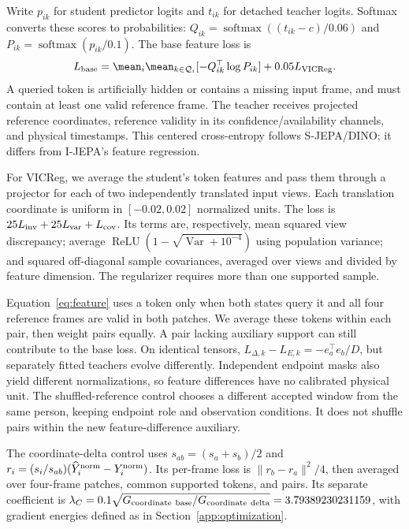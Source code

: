 Write $p_{ik}$ for student predictor logits and $t_{ik}$ for detached teacher logits. Softmax converts these scores to probabilities: $Q_{ik}=\operatorname{softmax}((t_{ik}-c)/0.06)$ and $P_{ik}=\operatorname{softmax}(p_{ik}/0.1)$. The base feature loss is
\begin{equation}
L_{\rm base}=\mean_i\mean_{k\in\mathcal Q_i}[-Q_{ik}^{\top}\log P_{ik}]+0.05L_{\rm VICReg}.
\end{equation}
A queried token is artificially hidden or contains a missing input frame, and must contain at least one valid reference frame. The teacher receives projected reference coordinates, reference validity in its confidence/availability channels, and physical timestamps. This centered cross-entropy follows S-JEPA/DINO; it differs from I-JEPA's feature regression.

For VICReg, we average the student's token features and pass them through a projector for each of two independently translated input views. Each translation coordinate is uniform in $[-0.02,0.02]$ normalized units. The loss is $25L_{\rm inv}+25L_{\rm var}+L_{\rm cov}$. Its terms are, respectively, mean squared view discrepancy; average $\operatorname{ReLU}(1-\sqrt{\operatorname{Var}+10^{-4}})$ using population variance; and squared off-diagonal sample covariances, averaged over views and divided by feature dimension. The regularizer requires more than one supported sample.

Equation~\ref{eq:feature} uses a token only when both states query it and all four reference frames are valid in both patches. We average these tokens within each pair, then weight pairs equally. A pair lacking auxiliary support can still contribute to the base loss. On identical tensors, $L_{\Delta,k}-L_{E,k}=-e_a^\top e_b/D$, but separately fitted teachers evolve differently. Independent endpoint masks also yield different normalizations, so feature differences have no calibrated physical unit. The shuffled-reference control chooses a different accepted window from the same person, keeping endpoint role and observation conditions. It does not shuffle pairs within the new feature-difference auxiliary.

The coordinate-delta control uses $s_{ab}=(s_a+s_b)/2$ and $r_i=(s_i/s_{ab})(\widehat Y_i^{\rm norm}-Y_i^{\rm norm})$. Its per-frame loss is $\|r_b-r_a\|^2/4$, then averaged over four-frame patches, common supported tokens, and pairs. Its separate coefficient is $\lambda_C=0.1\sqrt{G_{\rm coordinate\ base}/G_{\rm coordinate\ delta}}=3.79389230231159$, with gradient energies defined as in Section~\ref{app:optimization}.

